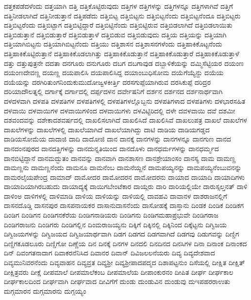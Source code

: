 {ದತ್ತಕಪಡೆದಳೆಂದು
ದತ್ತಯಾಗಿ
ದತ್ತಿ
ದತ್ತಿಕೊಟ್ಟಿರುವುದು
ದತ್ತಿಗಳ
ದತ್ತಿಗಳನ್ನು
ದತ್ತಿಗಳನ್ನೂ
ದತ್ತಿಗಳಾಗಿವೆ
ದತ್ತಿಗೆ
ದತ್ತಿನೀಡಲಾಗಿದೆ
ದತ್ತಿನೀಡುತ್ತಾನೆ
ದತ್ತಿಪಡೆದು
ದತ್ತಿಬಿಟ್ಟ
ದತ್ತಿಬಿಟ್ಟನು
ದತ್ತಿಬಿಟ್ಟನೆಂದು
ದತ್ತಿಬಿಟ್ಟನೆಂದೂ
ದತ್ತಿಬಿಟ್ಟರು
ದತ್ತಿಬಿಟ್ಟರೆಂದು
ದತ್ತಿಬಿಟ್ಟಾಗ
ದತ್ತಿಬಿಟ್ಟಿದ್ದಾರೆ
ದತ್ತಿಬಿಟ್ಟಿನೆಂದು
ದತ್ತಿಬಿಟ್ಟಿರುವ
ದತ್ತಿಬಿಡಲಾಗಿದೆ
ದತ್ತಿಬಿಡಲಾಯಿತು
ದತ್ತಿಬಿಡುತ್ತಾನೆ
ದತ್ತಿಬಿಡುತ್ತಾರೆ
ದತ್ತಿಬಿಡುತ್ತಾಳೆ
ದತ್ತಿಬಿಡುವ
ದತ್ತಿಬಿಡುವುದು
ದತ್ತಿಯ
ದತ್ತಿಯನ್ನು
ದತ್ತಿಯಾಗಿ
ದತ್ತಿಯಾಗಿಬಿಟ್ಟನು
ದತ್ತಿಯಾಗಿಬಿಟ್ಟನೆಂದು
ದತ್ತಿಯು
ದತ್ತಿಶಾಸನ
ದತ್ತಿಶಾಸನಗಳೆಂದು
ದತ್ತಿಹಾಕಿಕೊಟ್ಟನೆಂದು
ದತ್ತಿಹಾಕಿಕೊಟ್ಟಿರುತ್ತಾನೆ
ದತ್ತಿಹಾಕಿಕೊಡಲಾಗಿತ್ತು
ದತ್ತಿಹಾಕಿಕೊಡುತ್ತಾನೆ
ದತ್ತಿಹಾಕಿಕೊಡುತ್ತಾರೆ
ದತ್ತಿಹಾಕಿಕೊಡುತ್ತಾಳೆ
ದತ್ತು
ದತ್ತುಪುತ್ರನೇ
ದದತಾ
ದನಗೂರು
ದನುಗೂರು
ದಬಗ
ದಬಗಾವುಡ
ದಬ್ಬಾಳಿಕೆಯನ್ನು
ದಮ್ಮಿಸೆಟ್ಟಿಯರ
ದಯಂಣ
ದಯಂಣದೇವಣ್ಣ
ದಯಣ್ಣ
ದಯಪಾಲಿಸಿ
ದಯಪಾಲಿಸಿದ್ದ
ದಯಾಂಬುಧಿಸೋಮ
ದಯೆಗೆಯ್ಯೆನ್ದು
ದಯೆಯ
ದಯೆಯನ್ನು
ದರಗಿರಿತುಂಗನಿಂದುಕುಮುದೋಜ್ವಳಕೀರ್ತ್ತಿ
ದರಸಗುಪ್ಪೆಯಾಗಿರುವ
ದರಸಿಕುಪ್ಪೆ
ದರಿದ್ರರ
ದರಿಯಾದೌಲತ್ನಲ್ಲಿ
ದರ್ಗಾಕ್ಕೆ
ದರ್ಗಾದಲ್ಲಿ
ದರ್ಪ್ಪದಳನ
ದರ್ವೇಷನಿಗೆ
ದರ್ಶನ
ದರ್ಶನದ
ದರ್ಶನಾರ್ಥವಾಗಿ
ದಳದಳವಾಗಿ
ದಳಪತಿ
ದಳಪತಿಗಳ
ದಳಪತಿಗಳಲ್ಲಿ
ದಳಪತಿಗಳಲ್ಲೊಬ್ಬನು
ದಳಪತಿಗಳಾದ
ದಳಪತಿಗಳು
ದಳಭಾರಸಹಿತ
ದಳವಾಯಿ
ದಳವಾಯಿಗಳ
ದಳವಾಯಿಗಳಿಂದ
ದಳವಾಯಿಗಳು
ದಳವಿಟ್ಟಿರಿದಲ್ಲಿ
ದಳೇ
ದವಳವಾಯಿ
ದವೆ
ದಶಮೀ
ದಶವಂದವನ್ನು
ದಶೇಕಾದಶವರ್ಷದಲ್ಲಿ
ದಾಖಲಿಸಲಾಗಿದೆ
ದಾಖಲಿಸಿದೆ
ದಾಖಲಿಸಿವೆ
ದಾಖಲುಪತ್ರ
ದಾಖಲೆ
ದಾಖಲೆಗಳ
ದಾಖಲೆಗಳನ್ನು
ದಾಖಲೆಗಳಲ್ಲಿ
ದಾಖಲೆಯಾಗಿದೆ
ದಾಖಲೆಯಾಗಿದ್ದು
ದಾಟಿ
ದಾಡಿಯ
ದಾಡಿಯಗಡ್ಡದ
ದಾಡಿಯಸೋಮೆಯ
ದಾದಾಜಿ
ದಾದಿ
ದಾದೋಜಿ
ದಾನ
ದಾನಕ್ಕೆ
ದಾನಗಳನ್ನು
ದಾನಗಳನ್ನೂ
ದಾನಗುಣ
ದಾನದ
ದಾನದಂನಪುರದ
ದಾನದತ್ತಿಗಳನ್ನು
ದಾನದುನ್ನತಿಯಿಂದ
ದಾನದೊಳು
ದಾನಧರ್ಮಗಳನ್ನು
ದಾನಧರ್ಮ್ಮದ
ದಾನಬಿಟ್ಟಿದ್ದಾನೆ
ದಾನಮದ್ಭುತಂ
ದಾನವನ್ನು
ದಾನವಾಗಿ
ದಾನಶಾಸಣ
ದಾನಶ್ರೇಯಾಂಸಂ
ದಾನಸ್ಯ
ದಾಮ
ದಾಮಣ್ಣ
ದಾಮಣ್ಣನು
ದಾಮಣ್ಣನೆಂದು
ದಾಮನೂ
ದಾಮನೆಂಬ
ದಾಮನೆಯ್ದನೆ
ದಾಮಪಯ್ಯನನ್ನು
ದಾಮಪಯ್ಯನೆಂಬುವನನ್ನು
ದಾಮರಲೈಯಪೇಂದ್ರ
ದಾಮಾದ್
ದಾಮೋದರ
ದಾಮೋದರನ
ದಾಮೋದರನು
ದಾಯಾದ
ದಾಯಾದಿ
ದಾಯಾದಿಗಳು
ದಾಯಾದಿಯಾಗಿರಬಹುದು
ದಾಯಾದ್ಯಕ್ಕೆ
ದಾಯಿಗಬೇಂಟೆಕಾರ
ದಾಯ್ಗರು
ದಾರಿ
ದಾರಿಯಲ್ಲಿಯೇ
ದಾರುಸ್ಸಲ್ತನತ್
ದಾಳಿ
ದಾಳಿಂಅ
ದಾಳಿಗಳಲ್ಲಿ
ದಾಳಿಮಾಡಿ
ದಾಳಿಯ
ದಾಳಿಯನ್ನು
ದಾಳಿಯಲ್ಲಿ
ದಾವಹವಿ
ದಾವಾನಳ
ದಾಶರಾಜನಲ್ಲಿಗೆ
ದಾಸನದೊಡ್ಡಿ
ದಾಸನಪುರ
ದಾಸಪನಾಯಕರ
ದಾಸಾನುದಾಸನೆಂದು
ದಾಸೋಹಕ್ಕೆ
ದಾಸ್ತಾನು
ದಿಂಡಕ
ದಿಂಡಿಕ
ದಿಂಡಿಕಗ
ದಿಂಡಿಗ
ದಿಂಡಿಗನ
ದಿಂಡಿಗನಕೆರೆಯ
ದಿಂಡಿಗನಾಡಿಯರು
ದಿಂಡಿಗನು
ದಿಂಡಿಗಮಹಾಪ್ರಭುವೇ
ದಿಂಡಿಗರಾಜ
ದಿಂಡಿಗರಾಜನು
ದಿಂಡಿಗರು
ದಿಂಡಿಗಲ್ಲಿನ
ದಿಂಮರಾಜಯ್ಯನು
ದಿಕ್ಕಿಗೆ
ದಿಕ್ಕಿನಲ್ಲಿ
ದಿಕ್ಕಿನಿಂದ
ದಿಕ್ಕೆಟ್ಟನು
ದಿಗ್ವಿಜಯ
ದಿಗ್ವಿಜಯಗಳನ್ನು
ದಿಗ್ವಿಜಯದ
ದಿಗ್ವಿಜಯಾರ್ಥವಾಗಿ
ದಿಡಗ
ದಿಡಗದ
ದಿಡಗವಾಗಿದೆ
ದಿಡಗವು
ದಿಡುಗವನ್ನು
ದಿಣ್ಡಿಗ
ದಿಣ್ಡಿಗಕೂಡಲೂರು
ದಿಣ್ಡಿಗೋ
ದಿಣ್ಣೆಯ
ದಿನ
ದಿನಕ್ಕೆ
ದಿನಗಳ
ದಿನದಲಿ
ದಿನದಿನದ
ದಿನಸಿಗಳ
ದಿನಾ
ದಿನಾಂಕ
ದಿನಾಂಕದ
ದಿನ್
ದಿವಂಗತನಾದಾಗ
ದಿವಾಕರನೆನಿಸಿದ
ದಿವಾನರ
ದಿವಾನ್
ದಿವಿಜಲಲನೆಯರು
ದಿವ್ಯ
ದಿವ್ಯದೇಶವಾದ
ದಿವ್ಯಮುನಿವರನೆಂದು
ದಿವ್ಯವಾಹನ
ದಿವ್ಯವ್ರತ
ದಿವ್ಯಶ್ರೀ
ದಿವ್ಯಶ್ರೀಪಾದಪದ್ಮದ
ದಿಶಾಪಟ್ಟನುಂ
ದಿಸೆಯಲ್ಲಿ
ದೀಕ್ಷಿತ
ದೀಕ್ಷಿತ್
ದೀಕ್ಷಿತ್ರವರು
ದೀಕ್ಷೆ
ದೀಪಮಾಲೆ
ದೀಪಮಾಲೆಕಂಬ
ದೀಪಮಾಲೆಯ
ದೀಪಾಂಕುರನಂ
ದೀಪಿತ
ದೀರ್ಘ
ದೀರ್ಘಕಾಲ
ದೀರ್ಘಕಾಲದಿಂದ
ದೀರ್ಘವಾಗಿ
ದೀರ್ಘವಾದ
ದೀವಿಗೆಗೆ
ದುಂಡು
ದುಂಡುವಿನ
ದುಂಡುವು
ದುಇಪಹರರಾಉತು
ದುಗ್ಗಮಾರನ
ದುಗ್ಗಮಾರನು
ದುಗ್ಗಯ್ಯಂ
}
